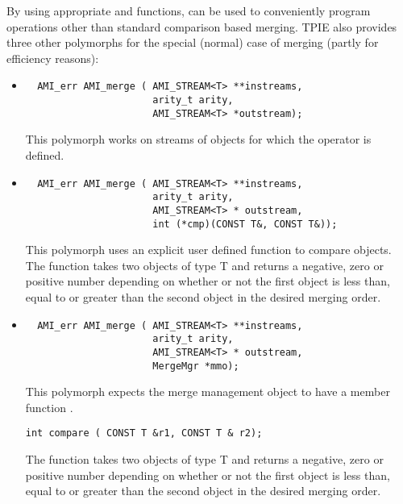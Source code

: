 
By using appropriate  and 
functions,  can be used to conveniently program
operations other than standard comparison based merging. TPIE also provides
three other  polymorphs for the special (normal) case of
merging (partly for efficiency reasons):

\begin{itemize}
    \item
\begin{verbatim}
  AMI_err AMI_merge ( AMI_STREAM<T> **instreams,
                      arity_t arity, 
                      AMI_STREAM<T> *outstream);
\end{verbatim}
This polymorph works on streams of objects for which the operator
\myverb{<} is defined.

\item 
\begin{verbatim}
  AMI_err AMI_merge ( AMI_STREAM<T> **instreams,
                      arity_t arity,
                      AMI_STREAM<T> * outstream,
                      int (*cmp)(CONST T&, CONST T&));
\end{verbatim}
This polymorph uses an explicit user defined function to compare
objects. The function takes two objects of type T and returns a negative,
zero or positive number depending on whether or not the first object is
less than, equal to or greater than the second object in the desired
merging order.

\item
\begin{verbatim}
  AMI_err AMI_merge ( AMI_STREAM<T> **instreams,
                      arity_t arity,
                      AMI_STREAM<T> * outstream,
                      MergeMgr *mmo);
\end{verbatim}
This polymorph expects the merge management object
 to have a member function .
\begin{verbatim}
int compare ( CONST T &r1, CONST T & r2); 
\end{verbatim}
The function takes two objects of type T and returns a negative,
zero or positive number depending on whether or not the first object is
less than, equal to or greater than the second object in the desired
merging order.


\end{itemize}

